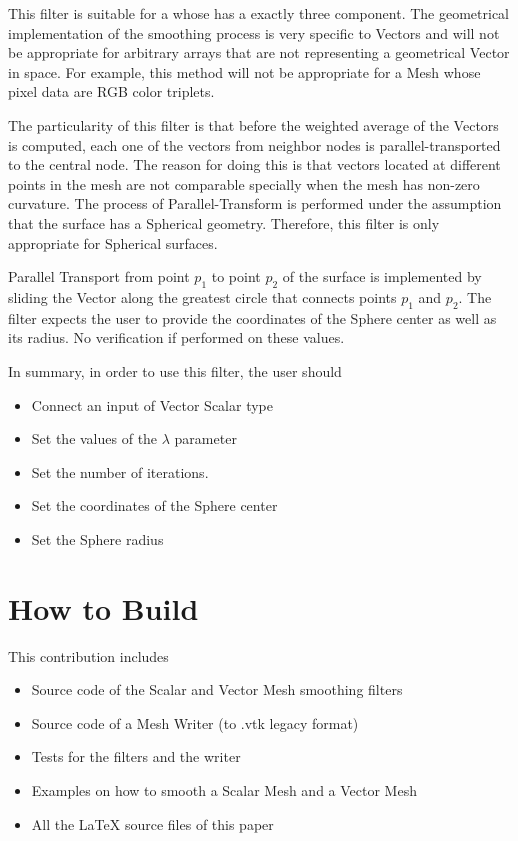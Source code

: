 \documentclass{InsightArticle}
\begin{document}
This filter is suitable for a  whose  has a
exactly three component. The geometrical implementation of the smoothing
process is very specific to Vectors and will not be appropriate for arbitrary
arrays that are not representing a geometrical Vector in space. For example,
this method will not be appropriate for a Mesh whose pixel data are RGB color
triplets.

The particularity of this filter is that before the weighted average of the
Vectors is computed, each one of the vectors from neighbor nodes is
parallel-transported to the central node. The reason for doing this is that
vectors located at different points in the mesh are not comparable specially
when the mesh has non-zero curvature. The process of Parallel-Transform is
performed under the assumption that the surface has a Spherical geometry.
Therefore, this filter is only appropriate for Spherical surfaces.

Parallel Transport from point $p_1$ to point $p_2$ of the surface is
implemented by sliding the Vector along the greatest circle that connects
points $p_1$ and $p_2$. The filter expects the user to provide the coordinates
of the Sphere center as well as its radius. No verification if performed on
these values.

In summary, in order to use this filter, the user should 

\begin{itemize}
\item Connect an input  of Vector Scalar type
\item Set the values of the $\lambda$ parameter
\item Set the number of iterations.
\item Set the coordinates of the Sphere center
\item Set the Sphere radius
\end{itemize}


\section{How to Build}

This contribution includes

\begin{itemize}
\item Source code of the Scalar and Vector Mesh smoothing filters
\item Source code of a Mesh Writer (to .vtk legacy format)
\item Tests for the filters and the writer
\item Examples on how to smooth a Scalar Mesh and a Vector Mesh
\item All the LaTeX source files of this paper
\end{itemize}
\end{document}
